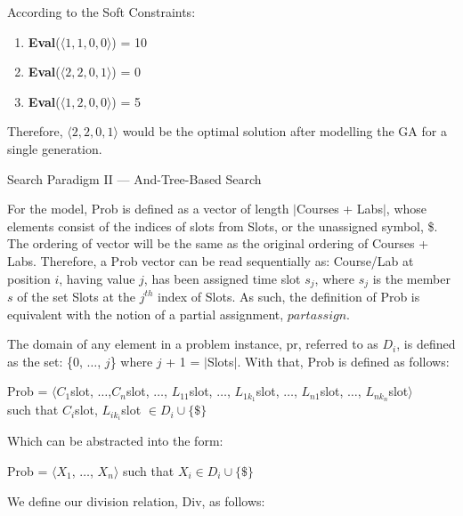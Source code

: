 \documentclass[11pt, oneside]{article}   	%
\begin{document}
\noindent According to the Soft Constraints:
\begin{enumerate}
\item \textbf{Eval}($\langle 1, 1, 0, 0  \rangle$) = 10
\item \textbf{Eval}($\langle 2, 2, 0, 1  \rangle$) = 0
\item \textbf{Eval}($\langle 1, 2, 0, 0  \rangle$) = 5
\end{enumerate}

\noindent Therefore, $\langle 2, 2, 0, 1  \rangle$ would be the optimal solution after modelling the GA for a single generation.

\newpage

\centerline{{\Large Search Paradigm II --- And-Tree-Based Search}}


\noindent For the model, Prob is defined as a vector of length $\vert$Courses + Labs$\vert$, whose elements consist of the indices of slots from Slots, or the unassigned symbol, \$. The ordering of vector will be the same as the original ordering of Courses + Labs. Therefore, a Prob vector can be read sequentially as: Course/Lab at position $i$, having value $j$, has been assigned time slot $s_{j}$, where $s_{j}$ is the member $s$ of the set Slots at the $j^{th}$ index of Slots. As such, the definition of Prob is equivalent with the notion of a partial assignment, $\textit{partassign}$.

\noindent The domain of any element in a problem instance, pr, referred to as $D_{i}$, is defined as the set: \{0, $\dots$, $j$\} where $j$ + 1 = $\vert$Slots$\vert$. With that, Prob is defined as follows:

\begin{center}
{Prob = $\langle$$C_{1}$slot, $\dots$,$C_{n}$slot, $\dots$, $L_{11}$slot, $\dots$, $L_{1k_{1}}$slot, $\dots$, $L_{n1}$slot,  $\dots$, $L_{nk_{n}}$slot$\rangle$ \\ such that $C_{i}$slot, $L_{ik_{i}}$slot $\in D_{i} \cup \big\{\$\big\}$}
\end{center}

\noindent Which can be abstracted into the form:

\begin{center}
{Prob = $\langle$$X_{1}$, $\dots$, $X_{n}$$\rangle$ such that $X_{i} \in D_{i} \cup \big\{\$\big\}$ }
\end{center}
We define our division relation, Div, as follows:\\
\end{document}
